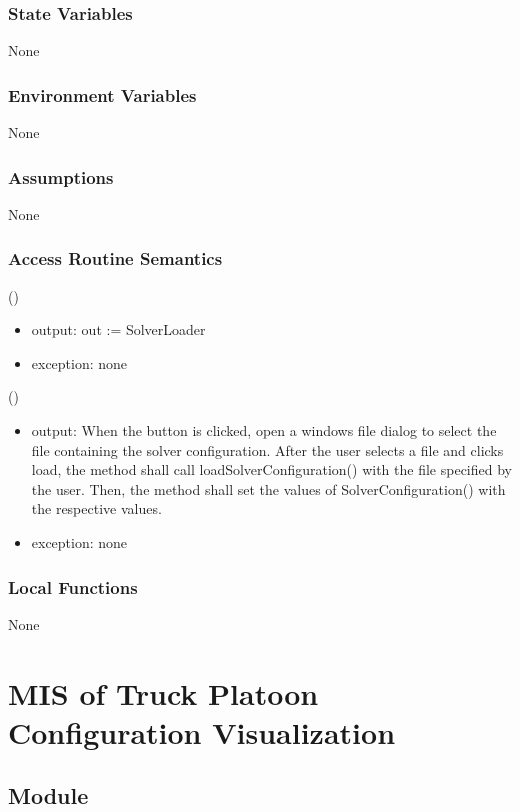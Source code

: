\documentclass[12pt, titlepage]{article}
\begin{document}
\subsubsection{State Variables}
None
\subsubsection{Environment Variables}
None
\subsubsection{Assumptions}
None
\subsubsection{Access Routine Semantics}

()
\begin{itemize}
\item output: out :=  SolverLoader
\item exception: none
\end{itemize}

()
\begin{itemize}
\item output: When the button is clicked, open a windows file dialog to select the file containing the solver configuration. After the user selects a file and clicks load, the method shall call loadSolverConfiguration() with the file specified by the user. Then, the method shall set the values of SolverConfiguration() with the respective values.
\item exception: none
\end{itemize}

\subsubsection{Local Functions}
None
\newpage

\newpage
\section{MIS of Truck Platoon Configuration Visualization} \label{PlatoonVisualizer}

\subsection{Module}
\end{document}
